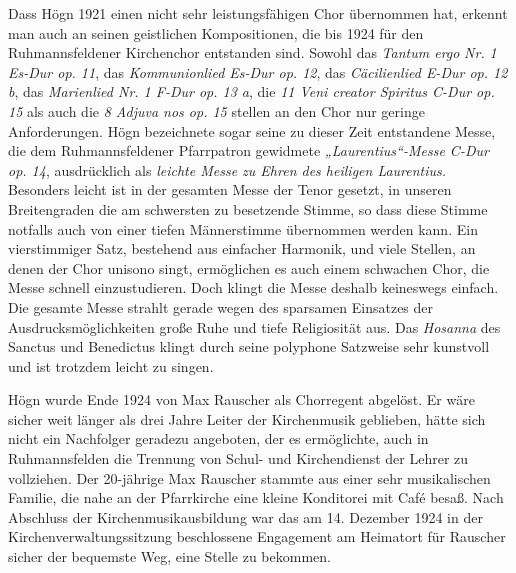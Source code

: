 \documentclass{book}
\begin{document}
Dass Högn 1921 einen nicht sehr leistungsfähigen Chor übernommen hat,
erkennt man auch an seinen geistlichen Kompositionen, die bis 1924 für
den Ruhmannsfeldener Kirchenchor entstanden sind. Sowohl das
\textit{Tantum ergo} \textit{Nr.} \textit{1 Es-Dur op. 11}, das
\textit{Kommunionlied Es-Dur op. 12}, das \textit{Cäcilienlied E-Dur
op. 12 b}, das \textit{Marienlied Nr. 1 F-Dur op. 13 a}, die \textit{11
Veni creator Spiritus C-Dur op. 15} als auch die \textit{8 Adjuva nos
op. 15} stellen an den Chor nur geringe Anforderungen. Högn bezeichnete
sogar seine zu dieser Zeit entstandene Messe, die dem
Ruh\-mannsfeldener Pfarrpatron gewidmete \textit{„Laurentius“-Messe
C-Dur op. 14}, aus\-drücklich als \textit{leichte Messe zu Ehren des
heiligen Laurentius.} Besonders leicht ist in der gesamten Messe der
Tenor gesetzt, in unseren Breitengraden die am schwersten zu besetzende
Stimme, so dass diese Stimme notfalls auch von einer tiefen
Männerstimme übernommen werden kann. Ein vierstimmiger Satz, bestehend
aus einfacher Harmonik, und viele Stellen, an denen der Chor unisono
singt, ermöglichen es auch einem schwachen Chor, die Messe schnell
einzustudieren. Doch klingt die Messe deshalb keineswegs einfach. Die
ge\-samte Messe strahlt gerade wegen des sparsamen Einsatzes der
Ausdrucks\-möglichkeiten große Ruhe und tiefe Religiosität aus. Das
\textit{Hosanna} des Sanctus und Benedictus klingt durch seine
polyphone Satzweise sehr kunstvoll und ist trotzdem leicht zu singen. 

Högn wurde Ende 1924 von Max Rauscher als Chorregent abgelöst. Er wäre
sicher weit länger als drei Jahre Leiter der Kirchenmusik geblieben,
hätte sich nicht ein Nachfolger geradezu angeboten, der es ermöglichte,
auch in Ruhmannsfelden die Trennung von Schul- und Kirchendienst der
Lehrer zu vollziehen. Der 20-jährige Max Rauscher stammte aus einer
sehr musikali\-schen Familie, die nahe an der Pfarrkirche eine kleine
Konditorei mit Café besaß. Nach Abschluss der Kirchenmusikausbildung
war das am 14. Dezem\-ber 1924 in der Kirchenverwaltungssitzung
beschlossene Engagement am Heimatort für Rauscher sicher der bequemste
Weg, eine Stelle zu bekommen.

\end{document}
